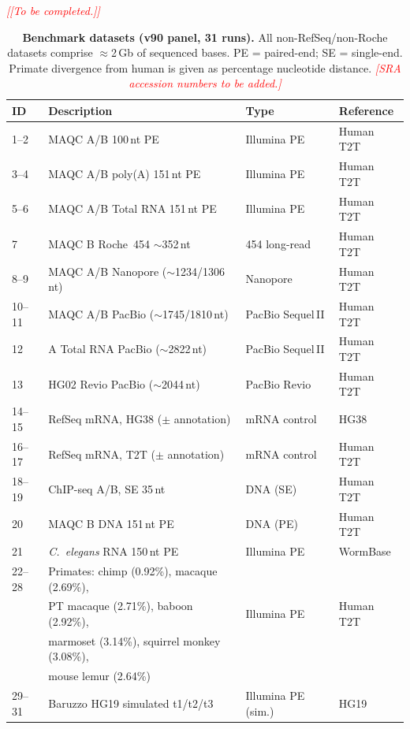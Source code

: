 \documentclass[11pt]{article}
\newcommand{\edcomment}[1]{\textcolor{red}{\textit{[#1]}}}
\begin{document}
\edcomment{[To be completed.]}




\clearpage


\begin{table}[h]
\caption{\textbf{Benchmark datasets (v90 panel, 31 runs).}
  All non-RefSeq/non-Roche datasets comprise $\approx$2\,Gb of
  sequenced bases. PE = paired-end; SE = single-end.
  Primate divergence from human is given as percentage nucleotide
  distance.
  \edcomment{SRA accession numbers to be added.}}
\label{tab:datasets}
\footnotesize
\begin{tabular}{llll}
\toprule
\textbf{ID} & \textbf{Description} & \textbf{Type} & \textbf{Reference} \\
\midrule
1--2  & MAQC A/B 100\,nt PE                 & Illumina PE & Human T2T \\
3--4  & MAQC A/B poly(A) 151\,nt PE         & Illumina PE & Human T2T \\
5--6  & MAQC A/B Total RNA 151\,nt PE       & Illumina PE & Human T2T \\
7     & MAQC B Roche~454 $\sim$352\,nt      & 454 long-read & Human T2T \\
8--9  & MAQC A/B Nanopore ($\sim$1234/1306\,nt) & Nanopore & Human T2T \\
10--11 & MAQC A/B PacBio ($\sim$1745/1810\,nt) & PacBio Sequel\,II & Human T2T \\
12    & A Total RNA PacBio ($\sim$2822\,nt) & PacBio Sequel\,II & Human T2T \\
13    & HG02 Revio PacBio ($\sim$2044\,nt)  & PacBio Revio & Human T2T \\
14--15 & RefSeq mRNA, HG38 ($\pm$ annotation) & mRNA control & HG38 \\
16--17 & RefSeq mRNA, T2T ($\pm$ annotation)  & mRNA control & Human T2T \\
18--19 & ChIP-seq A/B, SE 35\,nt            & DNA (SE) & Human T2T \\
20    & MAQC B DNA 151\,nt PE               & DNA (PE)  & Human T2T \\
21    & \textit{C.\ elegans} RNA 150\,nt PE & Illumina PE & WormBase \\
22--28 & Primates: chimp (0.92\%), macaque (2.69\%), & & \\
      & PT macaque (2.71\%), baboon (2.92\%), & Illumina PE & Human T2T \\
      & marmoset (3.14\%), squirrel monkey (3.08\%), & & \\
      & mouse lemur (2.64\%) & & \\
29--31 & Baruzzo HG19 simulated t1/t2/t3    & Illumina PE (sim.) & HG19 \\
\bottomrule
\end{tabular}
\end{table}
\end{document}
